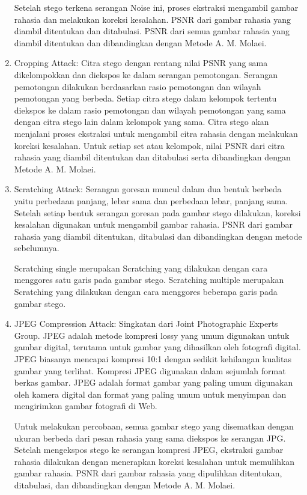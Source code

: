\documentclass{ittelkom}
\begin{document}
\begin{enumerate}
          Setelah stego terkena serangan Noise ini, proses ekstraksi mengambil gambar
          rahasia dan melakukan koreksi kesalahan. PSNR dari gambar rahasia yang diambil
          ditentukan dan ditabulasi. PSNR dari semua gambar rahasia yang diambil
          ditentukan dan dibandingkan dengan Metode A. M. Molaei.

    \item Cropping Attack: Citra stego dengan rentang nilai PSNR yang sama dikelompokkan
          dan diekspos ke dalam serangan pemotongan. Serangan pemotongan dilakukan
          berdasarkan rasio pemotongan dan wilayah pemotongan yang berbeda. Setiap citra
          stego dalam kelompok tertentu diekspos ke dalam rasio pemotongan dan wilayah
          pemotongan yang sama dengan citra stego lain dalam kelompok yang sama. Citra
          stego akan menjalani proses ekstraksi untuk mengambil citra rahasia dengan
          melakukan koreksi kesalahan. Untuk setiap set atau kelompok, nilai PSNR dari
          citra rahasia yang diambil ditentukan dan ditabulasi serta dibandingkan dengan
          Metode A. M. Molaei.
    \item Scratching Attack: Serangan goresan muncul dalam dua bentuk berbeda yaitu
          perbedaan panjang, lebar sama dan perbedaan lebar, panjang sama. Setelah setiap
          bentuk serangan goresan pada gambar stego dilakukan, koreksi kesalahan
          digunakan untuk mengambil gambar rahasia. PSNR dari gambar rahasia yang diambil
          ditentukan, ditabulasi dan dibandingkan dengan metode sebelumnya.

          Scratching single merupakan Scratching yang dilakukan dengan cara menggores
          satu garis pada gambar stego. Scratching multiple merupakan Scratching yang
          dilakukan dengan cara menggores beberapa garis pada gambar stego.
    \item JPEG Compression Attack: Singkatan dari Joint Photographic Experts Group. JPEG
          adalah metode kompresi lossy yang umum digunakan untuk gambar digital, terutama
          untuk gambar yang dihasilkan oleh fotografi digital. JPEG biasanya mencapai
          kompresi 10:1 dengan sedikit kehilangan kualitas gambar yang
          terlihat.\cite{ch2015medical} Kompresi JPEG digunakan dalam sejumlah format
          berkas gambar. JPEG adalah format gambar yang paling umum digunakan oleh kamera
          digital dan format yang paling umum untuk menyimpan dan mengirimkan gambar
          fotografi di Web.

          Untuk melakukan percobaan, semua gambar stego yang disematkan dengan ukuran
          berbeda dari pesan rahasia yang sama diekspos ke serangan JPG. Setelah
          mengekspos stego ke serangan kompresi JPEG, ekstraksi gambar rahasia dilakukan
          dengan menerapkan koreksi kesalahan untuk memulihkan gambar rahasia. PSNR dari
          gambar rahasia yang dipulihkan ditentukan, ditabulasi, dan dibandingkan dengan
          Metode A. M. Molaei.
\end{enumerate}
\end{document}
